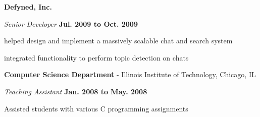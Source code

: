 \documentclass[10pt]{article}
\renewcommand{\section}[2]%
        {\pagebreak[2]\vspace{1.3\baselineskip}%
         \phantomsection\addcontentsline{toc}{section}{#1}%
         \hspace{0in}%
         \marginpar{
         \raggedright \scshape #1}#2}
\newenvironment{outerlist}[1][\enskip\textbullet]%
        {\begin{enumerate}[#1]}{\end{enumerate}%
         \vspace{-.6\baselineskip}}
\newenvironment{innerlist}[1][\enskip\textbullet]%
        {\begin{compactenum}[#1]}{\end{compactenum}}
\newcommand{\blankline}{\quad\pagebreak[2]}
\begin{document}
\blankline

\textbf{Defyned, Inc.}
\begin{outerlist}
	\item[] \textit{Senior Developer} \hfill \textbf{Jul. 2009 to Oct. 2009}
	\begin{innerlist}
		\item helped design and implement a massively scalable chat and search system
        \item integrated functionality to perform topic detection on chats
	\end{innerlist}
\end{outerlist}

\blankline

\textbf{Computer Science Department} - Illinois Institute of Technology, Chicago, IL
\begin{outerlist}
	\item[] \textit{Teaching Assistant} \hfill \textbf{Jan. 2008 to May. 2008}
	\begin{innerlist}
        \item Assisted students with various C programming assignments
	\end{innerlist}
\end{outerlist}


\end{document}

